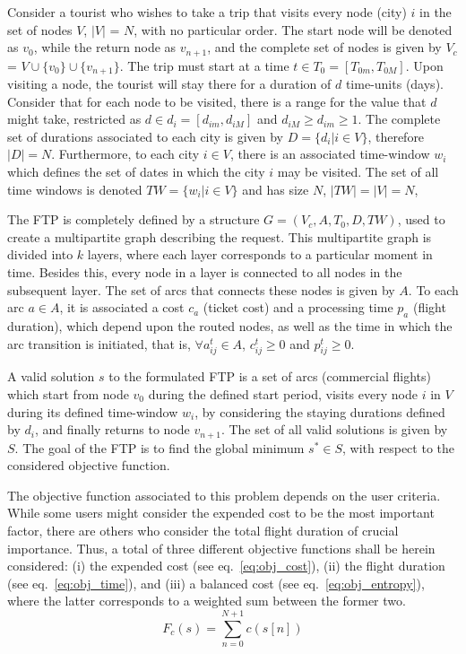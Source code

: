 \documentclass[onecolumn]{elsarticle}
\begin{document}
Consider a tourist who wishes to take a trip that visits every node (city) $i$ in the set of nodes $V$, $|V|$ = $N$, with no particular order. The start node will be denoted as $v_{0}$, while the return node as $v_{n+1}$, and the complete set of nodes is given by $V_c$ = $V \cup \{v_0\} \cup \{v_{n+1}\}$. The trip must start at a time $t \in T_0 = [T_{0m}, T_{0M}]$. Upon visiting a node, the tourist will stay there for a duration of $d$ time-units (days). Consider that for each node to be visited, there is a range for the value that $d$ might take, restricted as $d \in d_i = [d_{im}, d_{iM}]$ and $d_{iM} \geq d_{im} \geq 1$. The complete set of durations associated to each city is given by $D = \{ d_i | i \in V\}$, therefore $|D| = N$. Furthermore, to each city $i \in V$, there is an associated time-window $w_i$ which defines the set of dates in which the city $i$ may be visited. The set of all time windows is denoted $TW = \{w_i|i \in V\}$ and has size $N$, $|TW| = |V| = N$,

The FTP is completely defined by a structure $G = (V_c, A, T_{0}, D, TW)$, used to create a multipartite graph describing the request. This multipartite graph is divided into $k$ layers, where each layer corresponds to a particular moment in time. Besides this, every node in a layer is connected to all nodes in the subsequent layer. The set of arcs that connects these nodes is given by $A$. To each arc $a \in A$, it is associated a cost $c_{a}$ (ticket cost) and a processing time $p_{a}$ (flight duration), which depend upon the routed nodes, as well as the time in which the arc transition is initiated, that is, $\forall a_{ij}^{t} \in A$, $c_{ij}^{t} \geq 0$ and $p_{ij}^{t} \geq 0$.

A valid solution $s$ to the formulated FTP is a set of arcs (commercial flights) which start from node $v_0$ during the defined start period, visits every node $i$ in $V$ during its defined time-window $w_i$, by considering the staying durations defined by $d_i$, and finally returns to node $v_{n+1}$. The set of all valid solutions is given by $S$. The goal of the FTP is to find the global minimum $s^* \in S$, with respect to the considered objective function.

The objective function associated to this problem depends on the user criteria. While some users might consider the expended cost to be the most important factor, there are others who consider the total flight duration of crucial importance. Thus, a total of three different objective functions shall be herein considered: (i) the expended cost (see eq.~\ref{eq:obj_cost}), (ii) the flight duration (see eq.~\ref{eq:obj_time}), and (iii) a balanced cost (see eq.~\ref{eq:obj_entropy}), where the latter corresponds to a weighted sum between the former two. 
\begin{equation}
\label{eq:obj_cost}
  F_{c}(s) = \sum_{n=0}^{N+1} c(s[n])
\end{equation}
\end{document}
